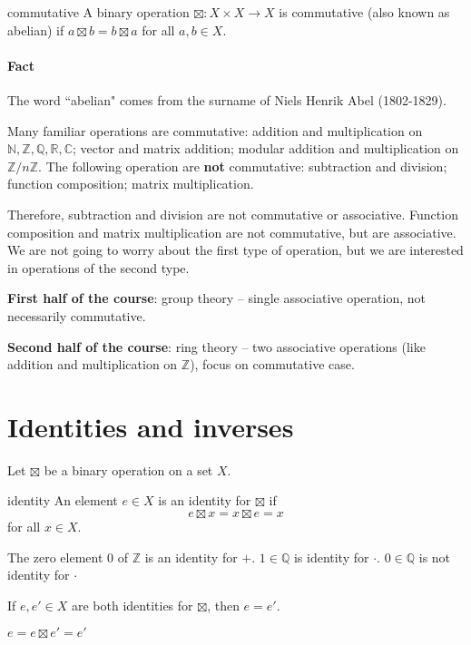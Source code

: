 \begin{defn}{commutative}
A binary operation $\boxtimes: X\times X\to X$ is commutative (also known as abelian) if $a\boxtimes b=b\boxtimes a$ for all $a,b\in X$.
\end{defn}

\paragraph{Fact} The word ``abelian" comes from the surname of Niels Henrik Abel (1802-1829).

Many familiar operations are commutative: addition and multiplication on $\mathbb{N,Z,Q,R,C}$; vector and matrix addition; modular addition and multiplication on $\mathbb Z/n\mathbb Z$. The following operation are \textbf{not} commutative: subtraction and division; function composition; matrix multiplication.

Therefore, subtraction and division are not commutative or associative. Function composition and matrix multiplication are not
commutative, but are associative. We are not going to worry about the first type of operation, but
we are interested in operations of the second type.

\textbf{First half of the course}: group theory -- single associative
operation, not necessarily commutative.

\textbf{Second half of the course}: ring theory -- two associative operations
(like addition and multiplication on $\mathbb Z$), focus on commutative case.

\section{Identities and inverses}
Let $\boxtimes$ be a binary operation on a set $X$.
\begin{defn}{identity}
An element $e\in X$ is an identity for $\boxtimes$ if
$$e\boxtimes x=x\boxtimes e=x$$
for all $x\in X$.
\end{defn}
\begin{ex}
The zero element 0 of $\mathbb Z$ is an identity for $+$. $1\in\mathbb Q$ is identity for $\cdot$. $0\in \mathbb Q$ is not identity for $\cdot$
\end{ex}

\begin{lemma}
If $e,e'\in X$ are both identities for $\boxtimes$, then $e=e'$.
\end{lemma}

\begin{pf}
$e=e\boxtimes e'=e'$
\end{pf}

